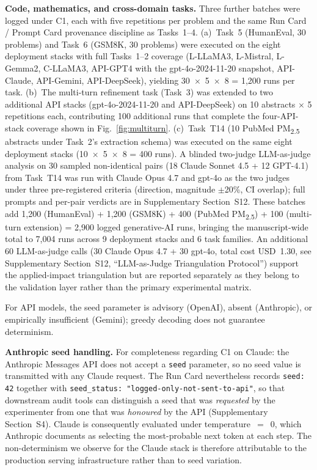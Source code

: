 \documentclass[sn-nature]{sn-jnl}
\begin{document}
\textbf{Code, mathematics, and cross-domain tasks.} Three further batches were logged under C1, each with five repetitions per problem and the same Run Card / Prompt Card provenance discipline as Tasks~1--4.
(a)~Task~5 (HumanEval, 30 problems) and Task~6 (GSM8K, 30 problems) were executed on the eight deployment stacks with full Tasks~1--2 coverage (L-LLaMA3, L-Mistral, L-Gemma2, C-LLaMA3, API-GPT4 with the gpt-4o-2024-11-20 snapshot, API-Claude, API-Gemini, API-DeepSeek), yielding 30~$\times$~5~$\times$~8 = 1{,}200 runs per task.
(b)~The multi-turn refinement task (Task~3) was extended to two additional API stacks (gpt-4o-2024-11-20 and API-DeepSeek) on 10 abstracts $\times$ 5 repetitions each, contributing 100 additional runs that complete the four-API-stack coverage shown in Fig.~\ref{fig:multiturn}.
(c)~Task~T14 (10 PubMed PM\textsubscript{2.5} abstracts under Task~2's extraction schema) was executed on the same eight deployment stacks (10~$\times$~5~$\times$~8 = 400 runs).
A blinded two-judge LLM-as-judge analysis on 30 sampled non-identical pairs (18 Claude Sonnet 4.5 + 12 GPT-4.1) from Task~T14 was run with Claude Opus 4.7 and gpt-4o as the two judges under three pre-registered criteria (direction, magnitude $\pm$20\%, CI overlap); full prompts and per-pair verdicts are in Supplementary Section~S12.
These batches add 1{,}200 (HumanEval) + 1{,}200 (GSM8K) + 400 (PubMed PM\textsubscript{2.5}) + 100 (multi-turn extension) = 2{,}900 logged generative-AI runs, bringing the manuscript-wide total to 7{,}004 runs across 9 deployment stacks and 6 task families. An additional 60 LLM-as-judge calls (30 Claude Opus 4.7 + 30 gpt-4o, total cost USD~1.30, see Supplementary Section~S12, ``LLM-as-Judge Triangulation Protocol'') support the applied-impact triangulation but are reported separately as they belong to the validation layer rather than the primary experimental matrix.

For API models, the seed parameter is advisory (OpenAI\cite{openai2024seed}), absent (Anthropic), or empirically insufficient (Gemini); greedy decoding does not guarantee determinism\cite{ouyang2024nondeterminism}.

\textbf{Anthropic seed handling.}
For completeness regarding C1 on Claude: the Anthropic Messages API does not accept a \texttt{seed} parameter, so no seed value is transmitted with any Claude request.
The Run Card nevertheless records \texttt{seed: 42} together with \texttt{seed\_status: "logged-only-not-sent-to-api"}, so that downstream audit tools can distinguish a seed that was \emph{requested} by the experimenter from one that was \emph{honoured} by the API (Supplementary Section~S4).
Claude is consequently evaluated under temperature~$=$~0, which Anthropic documents as selecting the most-probable next token at each step.
The non-determinism we observe for the Claude stack is therefore attributable to the production serving infrastructure rather than to seed variation.
\end{document}

